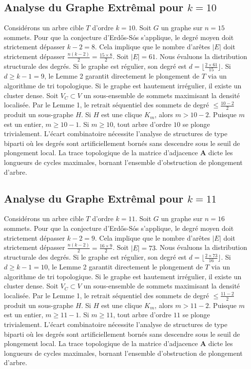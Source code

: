 \documentclass[11pt,a4paper]{article}
\begin{document}
\subsection{Analyse du Graphe Extr\^emal pour $k=10$}
Consid\'erons un arbre cible $T$ d'ordre $k=10$.
Soit $G$ un graphe sur $n=15$ sommets.
Pour que la conjecture d'Erd\H{o}s-S\'os s'applique, le degr\'e moyen doit strictement d\'epasser $k-2 = 8$.
Cela implique que le nombre d'ar\^etes $|E|$ doit strictement d\'epasser $\frac{n(k-2)}{2} = \frac{15 \times 8}{2}$.
Soit $|E| = 61$.
Nous \'evaluons la distribution structurale des degr\'es. Si le graphe est r\'egulier, son degr\'e est $d = \lfloor \frac{2 \times 61}{15} \rfloor$.
Si $d \geq k-1 = 9$, le Lemme 2 garantit directement le plongement de $T$ via un algorithme de tri topologique.
Si le graphe est hautement irr\'egulier, il existe un cluster dense. Soit $V_C \subset V$ un sous-ensemble de sommets maximisant la densit\'e localis\'ee.
Par le Lemme 1, le retrait s\'equentiel des sommets de degr\'e $\leq \frac{10-2}{2}$ produit un sous-graphe $H$.
Si $H$ est une clique $K_{m}$, alors $m > 10-2$. Puisque $m$ est un entier, $m \geq 10-1$. Si $m \geq 10$, tout arbre d'ordre $10$ se plonge trivialement.
L'\'ecart combinatoire n\'ecessite l'analyse de structures de type biparti o\`u les degr\'es sont artificiellement born\'es sans descendre sous le seuil de plongement local. La trace topologique de la matrice d'adjacence $\mathbf{A}$ dicte les longueurs de cycles maximales, bornant l'ensemble d'obstruction de plongement d'arbre.


\subsection{Analyse du Graphe Extr\^emal pour $k=11$}
Consid\'erons un arbre cible $T$ d'ordre $k=11$.
Soit $G$ un graphe sur $n=16$ sommets.
Pour que la conjecture d'Erd\H{o}s-S\'os s'applique, le degr\'e moyen doit strictement d\'epasser $k-2 = 9$.
Cela implique que le nombre d'ar\^etes $|E|$ doit strictement d\'epasser $\frac{n(k-2)}{2} = \frac{16 \times 9}{2}$.
Soit $|E| = 73$.
Nous \'evaluons la distribution structurale des degr\'es. Si le graphe est r\'egulier, son degr\'e est $d = \lfloor \frac{2 \times 73}{16} \rfloor$.
Si $d \geq k-1 = 10$, le Lemme 2 garantit directement le plongement de $T$ via un algorithme de tri topologique.
Si le graphe est hautement irr\'egulier, il existe un cluster dense. Soit $V_C \subset V$ un sous-ensemble de sommets maximisant la densit\'e localis\'ee.
Par le Lemme 1, le retrait s\'equentiel des sommets de degr\'e $\leq \frac{11-2}{2}$ produit un sous-graphe $H$.
Si $H$ est une clique $K_{m}$, alors $m > 11-2$. Puisque $m$ est un entier, $m \geq 11-1$. Si $m \geq 11$, tout arbre d'ordre $11$ se plonge trivialement.
L'\'ecart combinatoire n\'ecessite l'analyse de structures de type biparti o\`u les degr\'es sont artificiellement born\'es sans descendre sous le seuil de plongement local. La trace topologique de la matrice d'adjacence $\mathbf{A}$ dicte les longueurs de cycles maximales, bornant l'ensemble d'obstruction de plongement d'arbre.
\end{document}
